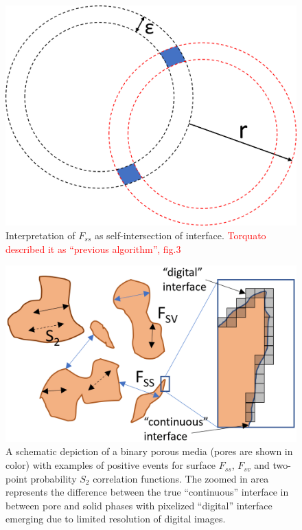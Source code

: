 \documentclass[reprint,amsmath,amssymb,aps,pre]{revtex4-1}
\begin{document}
\begin{figure}
  \centering
  \includegraphics[width=0.9\linewidth]{images/Fss.png}
  \caption[]{Interpretation of $F_{ss}$ as self-intersection of interface.
    \textcolor{red}{Torquato described it as ``previous algorithm'', fig.3}}
  \label{fig:Fss-explained}
\end{figure}


\begin{figure}[ht]
  \centering
  \includegraphics[width=0.9\linewidth]{images/scheme.png}
  \caption[]{A schematic depiction of a binary porous media (pores are shown in
    color) with examples of positive events for surface $F_{ss}$, $F_{sv}$ and
    two-point probability $S_2$ correlation functions. The zoomed in area
    represents the difference between the true ``continuous'' interface in
    between pore and solid phases with pixelized ``digital'' interface emerging
    due to limited resolution of digital images.}
  \label{fig:scheme}
\end{figure}
\end{document}
